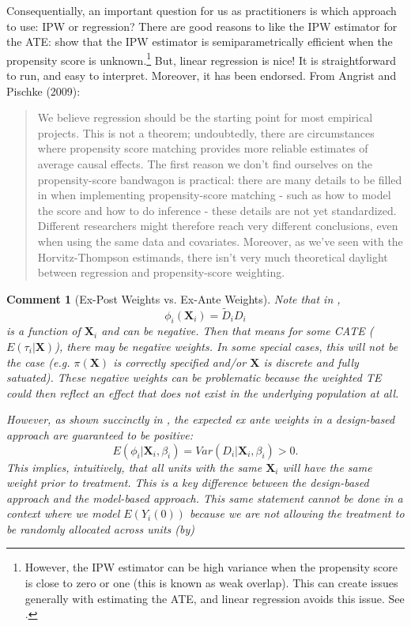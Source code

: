 \documentclass{tufte-handout}
\theoremstyle{break}
\newtheorem{cmt}{Comment}
\newcommand{\bX}{\mathbf{X}}
\begin{document}
Consequentially, an important question for us as practitioners is which approach to use: IPW or regression? There are good reasons to like the IPW estimator for the ATE: \citet{hirano2003efficient} show that the IPW estimator is semiparametrically efficient when the propensity score is unknown.\footnote{However, the IPW estimator can be high variance when the propensity score is close to zero or one (this is known as weak overlap). This can create issues generally with estimating the ATE, and linear regression avoids this issue. See \citet{goldsmith2022contamination}.} But, linear regression is nice! It is straightforward to run, and easy to interpret. Moreover, it has been endorsed. From Angrist and Pischke (2009):
    \begin{quote}
      We believe regression should be the starting point for most empirical projects. This is not a theorem; undoubtedly, there are circumstances where propensity score matching provides more reliable estimates of average causal effects. The first reason we don't find ourselves on the propensity-score bandwagon is practical: there are many details to be filled in when implementing propensity-score matching - such as how to model the score and how to do inference - these details are not yet standardized. Different researchers might therefore reach very different conclusions, even when using the same data and covariates. Moreover, as we've seen with the Horvitz-Thompson estimands, there isn't very much theoretical daylight between regression and propensity-score weighting.
      \end{quote}



\begin{boxF}
  \begin{cmt}[Ex-Post Weights vs. Ex-Ante Weights]
    Note that in ,  
    $$\phi_{i}(\bX_{i}) = \tilde{D}_{i}D_{i}$$
     is a function of $\bX_{i}$ and can be negative. Then that means for some CATE ($E(\tau_{i} | \bX)$), there may be negative weights.  In some special cases, this will not be the case (e.g. $\pi(\bX)$ is correctly specified and/or $\bX$ is discrete and fully satuated).  These negative weights can be problematic because the weighted TE could then reflect an effect that does not exist in the underlying population at all.

    \hspace{10pt} However, as shown succinctly in \citet{borusyak2024negative}, the \emph{expected} ex ante weights in a design-based approach are guaranteed to be positive:  
    $$E(\phi_{i} | \bX_{i}, \beta_{i}) = Var(D_{i} | \bX_{i}, \beta_{i}) > 0.$$ 
    This implies, intuitively, that all units with the same $\bX_{i}$ will have the same weight prior to treatment. This is a key difference between the design-based approach and the model-based approach. This same statement cannot be done in a context where we model $E(Y_{i}(0))$ because we are not allowing the treatment to be randomly allocated across units (by)
  \end{cmt}
\end{boxF}
\end{document}
